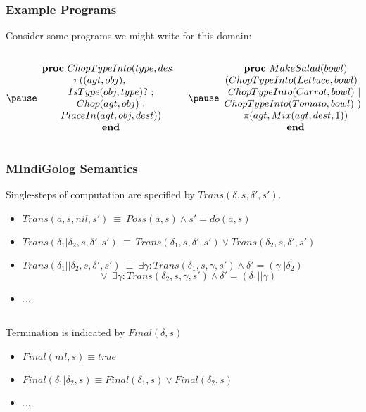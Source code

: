 \documentclass{beamer}
\begin{document}
\begin{frame}
\frametitle{Example Programs}

Consider some programs we might write for this domain:

\begin{columns}
  \begin{column}{0.5\textwidth}
\[
\pause
\begin{array}{c}
\mathbf{proc}\ ChopTypeInto(type,dest)\\
\pi((agt,obj), \ \ \ \ \ \ \ \\
IsType(obj,type)?\ ;\\
Chop(agt,obj)\ ;\\
PlaceIn(agt,obj,dest))\\
\mathbf{end}\end{array}\]
  \end{column}
  \begin{column}{0.5\textwidth}
\[
\pause
\begin{array}{c}
\mathbf{proc}\ MakeSalad(bowl)\\
(ChopTypeInto(Lettuce,bowl)\ ||\\
ChopTypeInto(Carrot,bowl)\ ||\\
ChopTypeInto(Tomato,bowl)\ )\ ;\\
\pi(agt, Mix(agt,dest,1))\\
\mathbf{end}\end{array}\]
  \end{column}
\end{columns}
\end{frame}

\begin{frame}
\frametitle{MIndiGolog Semantics}
Single-steps of computation are specified by  $Trans(\delta,s,\delta',s')$.
\begin{itemize}
  \item $Trans(a,s,nil,s')\ \equiv\ Poss(a,s)\wedge s'=do(a,s)$
  \item $Trans(\delta_1|\delta_2,s,\delta',s')\ \equiv\ Trans(\delta_1,s,\delta',s')\vee Trans(\delta_2,s,\delta',s')$
  \item $Trans(\delta_1||\delta_2,s,\delta',s')\ \equiv\ \exists\gamma:Trans(\delta_1,s,\gamma,s')\wedge\delta'=(\gamma||\delta_2)$\\
        $\ \ \ \ \ \ \ \ \ \ \ \ \ \ \ \ \ \ \ \ \ \ \ \ \ \ \ \ \ \ \ \ \ \ \ \vee\ \exists\gamma:Trans(\delta_2,s,\gamma,s')\wedge\delta'=(\delta_1||\gamma)$
  \item $\dots$
\end{itemize}
\ \\
\pause
Termination is indicated by $Final(\delta,s)$
\begin{itemize}
  \item $Final(nil,s) \equiv true$
  \item $Final(\delta_1|\delta_2,s) \equiv Final(\delta_1,s)\vee Final(\delta_2,s)$
  \item $\dots$
\end{itemize}
\end{frame}
\end{document}
